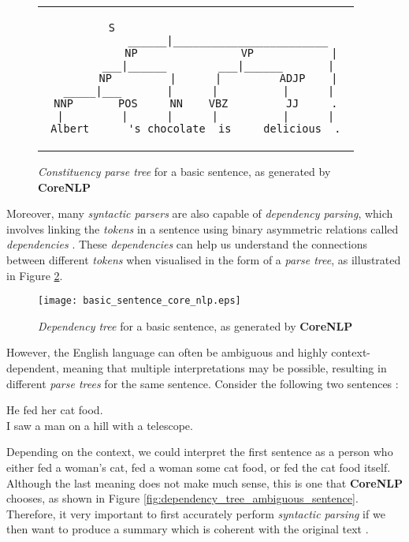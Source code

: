 \begin{figure}[H]
\centering
\begin{tabular}{c}
\begin{lstlisting}[numbers=none, basicstyle=\ttfamily, columns=fixed]
                   S                          
             ______|________________________   
            NP                VP            | 
         ___|______        ___|______       |  
        NP         |      |         ADJP    | 
   _____|___       |      |          |      |  
 NNP       POS     NN    VBZ         JJ     . 
  |         |      |      |          |      |  
Albert      's chocolate  is     delicious  .
\end{lstlisting}
\end{tabular}
\caption{\textit{Constituency parse tree} for a basic sentence, as generated by  \textbf{CoreNLP}}
\label{fig:constituency_tree_basic_sentence}
\end{figure}

\noindent
Moreover, many \textit{syntactic parsers} are also capable of \textit{dependency parsing}, which involves linking the \textit{tokens} in a sentence using binary asymmetric relations called \textit{dependencies} \cite{kubler_dependency_nodate}. These \textit{dependencies} can help us understand the connections between different \textit{tokens} when visualised in the form of a \textit{parse tree}, as illustrated in Figure \ref{fig:dependency_tree_basic_sentence}.

\begin{figure}[H]
\centering
\texttt{[image: basic\_sentence\_core\_nlp.eps]}
\caption{\textit{Dependency tree} for a basic sentence, as generated by  \textbf{CoreNLP}}
\label{fig:dependency_tree_basic_sentence}
\end{figure}

\noindent
However, the English language can often be ambiguous and highly context-dependent, meaning that multiple interpretations may be possible, resulting in different \textit{parse trees} for the same sentence. Consider the following two sentences \cite{noauthor_studying_nodate}:

\begin{displayquote}
He fed her cat food. \\
I saw a man on a hill with a telescope.
\end{displayquote}

Depending on the context, we could interpret the first sentence as a person who either fed a woman's cat, fed a woman some cat food, or fed the cat food itself. Although the last meaning does not make much sense, this is one that \textbf{CoreNLP} chooses, as shown in Figure \ref{fig:dependency_tree_ambiguous_sentence}. Therefore, it very important to first accurately perform \textit{syntactic parsing} if we then want to produce a summary which is coherent with the original text \cite{gomez-rodriguez_how_2019}.

